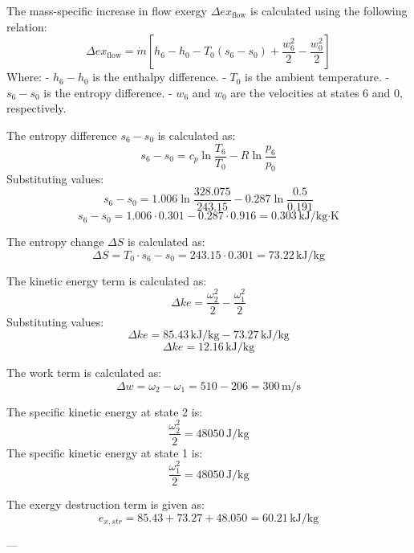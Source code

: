The mass-specific increase in flow exergy \( \Delta ex_{\text{flow}} \) is calculated using the following relation:  
\[
\Delta ex_{\text{flow}} = \dot{m} \left[ h_6 - h_0 - T_0 (s_6 - s_0) + \frac{w_6^2}{2} - \frac{w_0^2}{2} \right]
\]  
Where:  
- \( h_6 - h_0 \) is the enthalpy difference.  
- \( T_0 \) is the ambient temperature.  
- \( s_6 - s_0 \) is the entropy difference.  
- \( w_6 \) and \( w_0 \) are the velocities at states 6 and 0, respectively.  

The entropy difference \( s_6 - s_0 \) is calculated as:  
\[
s_6 - s_0 = c_p \ln \frac{T_6}{T_0} - R \ln \frac{p_6}{p_0}
\]  
Substituting values:  
\[
s_6 - s_0 = 1.006 \ln \frac{328.075}{243.15} - 0.287 \ln \frac{0.5}{0.191}
\]  
\[
s_6 - s_0 = 1.006 \cdot 0.301 - 0.287 \cdot 0.916 = 0.303 \, \text{kJ/kg·K}
\]  

The entropy change \( \Delta S \) is calculated as:  
\[
\Delta S = T_0 \cdot s_6 - s_0 = 243.15 \cdot 0.301 = 73.22 \, \text{kJ/kg}
\]

The kinetic energy term is calculated as:  
\[
\Delta ke = \frac{\omega_2^2}{2} - \frac{\omega_1^2}{2}
\]  
Substituting values:  
\[
\Delta ke = 85.43 \, \text{kJ/kg} - 73.27 \, \text{kJ/kg}
\]  
\[
\Delta ke = 12.16 \, \text{kJ/kg}
\]  

The work term is calculated as:  
\[
\Delta w = \omega_2 - \omega_1 = 510 - 206 = 300 \, \text{m/s}
\]  

The specific kinetic energy at state 2 is:  
\[
\frac{\omega_2^2}{2} = 48050 \, \text{J/kg}
\]  
The specific kinetic energy at state 1 is:  
\[
\frac{\omega_1^2}{2} = 48050 \, \text{J/kg}
\]  

The exergy destruction term is given as:  
\[
e_{x,str} = 85.43 + 73.27 + 48.050 = 60.21 \, \text{kJ/kg}
\]  

---